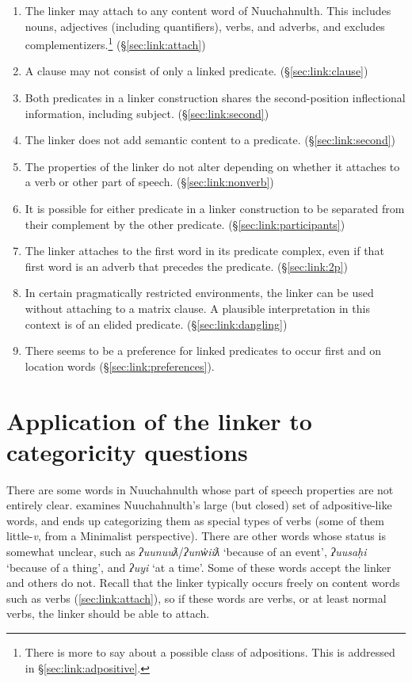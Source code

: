 \begin{enumerate}
	\item The linker may attach to any content word of Nuuchahnulth. This includes nouns, adjectives (including quantifiers), verbs, and adverbs, and excludes complementizers.\footnote{There is more to say about a possible class of adpositions. This is addressed in \S\ref{sec:link:adpositive}.} (\S\ref{sec:link:attach})
	\item A clause may not consist of only a linked predicate. (\S\ref{sec:link:clause})
	\item Both predicates in a linker construction shares the second-position inflectional information, including subject. (\S\ref{sec:link:second})
	\item The linker does not add semantic content to a predicate. (\S\ref{sec:link:second})
	\item The properties of the linker do not alter depending on whether it attaches to a verb or other part of speech. (\S\ref{sec:link:nonverb})
	\item It is possible for either predicate in a linker construction to be separated from their complement by the other predicate. (\S\ref{sec:link:participants})
	\item The linker attaches to the first word in its predicate complex, even if that first word is an adverb that precedes the predicate. (\S\ref{sec:link:2p})
	\item In certain pragmatically restricted environments, the linker can be used without attaching to a matrix clause. A plausible interpretation in this context is of an elided predicate. (\S\ref{sec:link:dangling})
	\item There seems to be a preference for linked predicates to occur first and on location words (\S\ref{sec:link:preferences}).
\end{enumerate}

\section{Application of the linker to categoricity questions} \label{sec:link:application}

There are some words in Nuuchahnulth whose part of speech properties are not entirely clear. \cite{woo2007b} examines Nuuchahnulth's large (but closed) set of adpositive-like words, and ends up categorizing them as special types of verbs (some of them little-\textit{v}, from a Minimalist perspective). There are other words whose status is somewhat unclear, such as \textit{ʔuunuuƛ}/\textit{ʔunw̓iiƛ} `because of an event', \textit{ʔuusaḥi} `because of a thing', and \textit{ʔuyi} `at a time'. Some of these words accept the linker and others do not. Recall that the linker typically occurs freely on content words such as verbs (\ref{sec:link:attach}), so if these words are verbs, or at least normal verbs, the linker should be able to attach.

